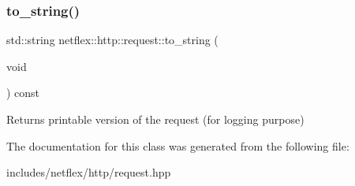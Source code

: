 \subsubsection{\texorpdfstring{to\+\_\+string()}{to\_string()}}
{\footnotesize\ttfamily std\+::string netflex\+::http\+::request\+::to\+\_\+string (\begin{DoxyParamCaption}\item[{void}]{ }\end{DoxyParamCaption}) const}

\begin{DoxyReturn}{Returns}
printable version of the request (for logging purpose) 
\end{DoxyReturn}


The documentation for this class was generated from the following file\+:\begin{DoxyCompactItemize}
\item 
includes/netflex/http/request.\+hpp\end{DoxyCompactItemize}
